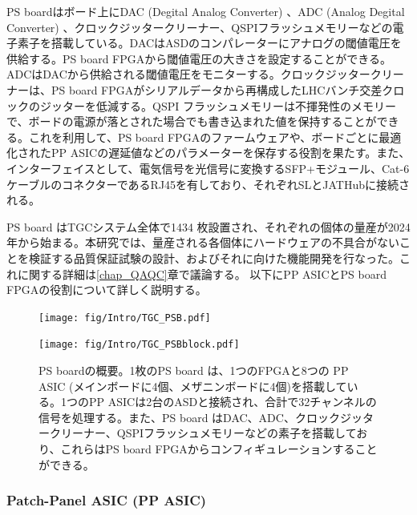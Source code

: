     PS boardはボード上にDAC  (Degital Analog Converter) 、ADC  (Analog Degital Converter) 、クロックジッタークリーナー、QSPIフラッシュメモリーなどの電子素子を搭載している。DACはASDのコンパレーターにアナログの閾値電圧を供給する。PS board FPGAから閾値電圧の大きさを設定することができる。ADCはDACから供給される閾値電圧をモニターする。クロックジッタークリーナーは、PS board FPGAがシリアルデータから再構成したLHCバンチ交差クロックのジッターを低減する。QSPI フラッシュメモリーは不揮発性のメモリーで、ボードの電源が落とされた場合でも書き込まれた値を保持することができる。これを利用して、PS board FPGAのファームウェアや、ボードごとに最適化されたPP ASICの遅延値などのパラメーターを保存する役割を果たす。また、インターフェイスとして、電気信号を光信号に変換するSFP+モジュール、Cat-6ケーブルのコネクターであるRJ45を有しており、それぞれSLとJATHubに接続される。
    
    PS board はTGCシステム全体で1434 枚設置され、それぞれの個体の量産が2024 年から始まる。本研究では、量産される各個体にハードウェアの不具合がないことを検証する品質保証試験の設計、およびそれに向けた機能開発を行なった。これに関する詳細は\ref{chap_QAQC}章で議論する。
    以下にPP ASICとPS board FPGAの役割について詳しく説明する。

    \begin{figure}
    \begin{minipage}[b]{.5\linewidth}
    \centering
    \texttt{[image: fig/Intro/TGC\_PSB.pdf]}
    \end{minipage}%
    \begin{minipage}[b]{.5\linewidth}
    \centering
    \texttt{[image: fig/Intro/TGC\_PSBblock.pdf]}
    \end{minipage}%
    \caption[PS boardの概要]{PS boardの概要。1枚のPS board は、1つのFPGAと8つの PP ASIC (メインボードに4個、メザニンボードに4個)を搭載している。1つのPP ASICは2台のASDと接続され、合計で32チャンネルの信号を処理する。また、PS board はDAC、ADC、クロックジッタークリーナー、QSPIフラッシュメモリーなどの素子を搭載しており、これらはPS board FPGAからコンフィギュレーションすることができる。}
    \label{TGC_PSB}
    \end{figure}

    \subsubsection*{Patch-Panel ASIC (PP ASIC)}


